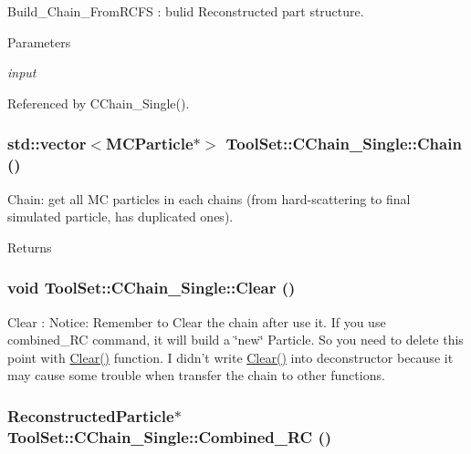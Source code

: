 Build\_\-Chain\_\-FromRCFS : bulid Reconstructed part structure. 
\begin{DoxyParams}{Parameters}
\item[{\em input}]\end{DoxyParams}


Referenced by CChain\_\-Single().\hypertarget{classToolSet_1_1CChain__Single_a4dfbe3f7c8f2b7b3c98918db0bdf0e35}{
\subsubsection[{Chain}]{\setlength{\rightskip}{0pt plus 5cm}std::vector$<$MCParticle$\ast$$>$ ToolSet::CChain\_\-Single::Chain ()}}
\label{classToolSet_1_1CChain__Single_a4dfbe3f7c8f2b7b3c98918db0bdf0e35}


Chain: get all MC particles in each chains (from hard-\/scattering to final simulated particle, has duplicated ones). \begin{DoxyReturn}{Returns}

\end{DoxyReturn}
\hypertarget{classToolSet_1_1CChain__Single_ae991aff7b553d31f4073eb5aaf0e0440}{
\subsubsection[{Clear}]{\setlength{\rightskip}{0pt plus 5cm}void ToolSet::CChain\_\-Single::Clear ()}}
\label{classToolSet_1_1CChain__Single_ae991aff7b553d31f4073eb5aaf0e0440}


Clear : Notice: Remember to Clear the chain after use it. If you use combined\_\-RC command, it will build a \char`\"{}new\char`\"{} Particle. So you need to delete this point with \hyperlink{classToolSet_1_1CChain__Single_ae991aff7b553d31f4073eb5aaf0e0440}{Clear()} function. I didn't write \hyperlink{classToolSet_1_1CChain__Single_ae991aff7b553d31f4073eb5aaf0e0440}{Clear()} into deconstructor because it may cause some trouble when transfer the chain to other functions. \hypertarget{classToolSet_1_1CChain__Single_acb6bc9bfa361f12472fc6ccfe899ede0}{
\subsubsection[{Combined\_\-RC}]{\setlength{\rightskip}{0pt plus 5cm}ReconstructedParticle$\ast$ ToolSet::CChain\_\-Single::Combined\_\-RC ()}}
\label{classToolSet_1_1CChain__Single_acb6bc9bfa361f12472fc6ccfe899ede0}


